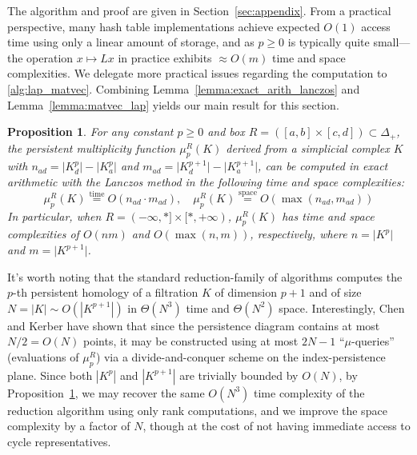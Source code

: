 \documentclass[pdflatex,sn-mathphys-num]{sn-jnl}
\newtheorem{proposition}[theorem]{Proposition}
\begin{document}
\noindent The algorithm and proof are given in Section~\ref{sec:appendix}. From a practical perspective, many hash table implementations achieve expected \(O(1)\) access time using only a linear amount of storage, and as \(p \geq 0\) is typically quite small---the operation \(x \mapsto Lx\) in practice exhibits \(\approx O(m)\) time and space complexities. We delegate more practical issues regarding the computation to \ref{alg:lap_matvec}. Combining Lemma~\ref{lemma:exact_arith_lanczos} and Lemma~\ref{lemma:matvec_lap} yields our main result for this section.

\begin{proposition}\label{prop:spectral_rank_complexity}
		For any constant $p \geq 0$ and box $R = ([a , b] \times [c , d]) \subset \Delta_+$, the persistent multiplicity function $\mu_p^R (K)$ derived from a simplicial complex $K$ with $n_{a d} = \lvert K_d^p \rvert - \lvert K_a^p \rvert$ and $m_{a d} =  \lvert K_d^{p + 1} \rvert - \lvert K_a^{p + 1} \rvert$, can be computed in exact arithmetic with the \emph{Lanczos method} in the following time and space complexities: 
$$ \mu_p^R (K) \stackrel{\text{time}}{=} O(n_{a d} \cdot m_{a d}), \quad \mu_p^{R}(K) \stackrel{\text{space}}{=} O(\max(n_{a d}, m_{a d})) $$
In particular, when $R = (-\infty, \ast] \times [\ast, +\infty)$, $\mu_p^R (K)$ has time and space complexities of $O(n m)$ and $O(\max(n,m))$, respectively, where $n = \lvert K^p \rvert$ and $m = \lvert K^{p+1} \rvert$.
\end{proposition}

\noindent It's worth noting that the standard reduction-family of algorithms computes the \(p\)-th persistent homology of a filtration \(K\) of dimension \(p + 1\) and of size \(N = |K| \sim O\left. \left( \left| K^{p + 1} \right| \right) \right.\) in \(\Theta\left. \left( N^{3} \right) \right.\) time and \(\Theta\left. \left( N^{2} \right) \right.\) space. Interestingly, Chen and Kerber \cite{chen2011output} have shown that since the persistence diagram contains at most \(N/2 = O(N)\) points, it may be constructed using at most \(2N - 1\) ``\(\mu\)-queries'' (evaluations of \(\mu_{p}^{R}\)) via a divide-and-conquer scheme on the index-persistence plane. Since both \(\left| K^{p} \right|\) and \(\left| K^{p + 1} \right|\) are trivially bounded by \(O(N)\), by Proposition~\ref{prop:spectral_rank_complexity}, we may recover the same \(O\left. \left( N^{3} \right) \right.\) time complexity of the reduction algorithm using only rank computations, and we improve the space complexity by a factor of \(N\), though at the cost of not having immediate access to cycle representatives.
\end{document}
